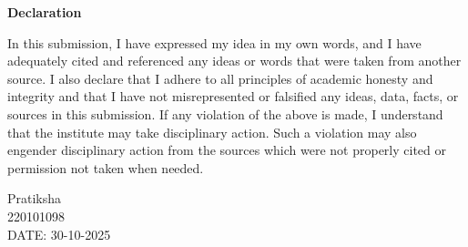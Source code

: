 \documentclass[a4paper,11pt,oneside]{report}
\begin{document}

\begin{center}
   { \LARGE \textbf{Declaration}}
\end{center}
In this submission, I have expressed my idea in my own words, and I have adequately cited and referenced any ideas or words that were taken from another source. I also declare that I adhere to all principles of academic honesty and integrity and that I have not misrepresented or falsified any ideas, data, facts, or sources in this submission. If any violation of the above is made, I understand that the institute may take disciplinary action. Such a violation may also engender disciplinary action from the sources which were not properly cited or permission not taken when needed.

\vspace{1cm}\hspace{8.5cm} Pratiksha \\
\vspace{1cm}\hspace{9cm} 220101098 \\
\vspace{1cm} DATE: 30-10-2025

\newpage
\end{document}
